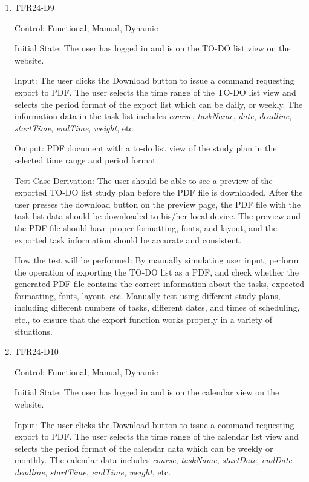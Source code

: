 \documentclass[12pt, titlepage]{article}
\begin{document}
\begin{enumerate}
\item{TFR24-D9\\}

Control: Functional, Manual, Dynamic
					
Initial State: The user has logged in and is on the TO-DO list view on the website.
					
Input: The user clicks the Download button to issue a command requesting export to PDF. The user selects the time range of the TO-DO list view and selects the period format of the export list which can be daily, or weekly. The information data in the task list includes \textit{course}, \textit{taskName}, \textit{date}, \textit{deadline}, \textit{startTime}, \textit{endTime}, \textit{weight}, etc.
					
Output: PDF document with a to-do list view of the study plan in the selected time range and period format.

Test Case Derivation: The user should be able to see a preview of the exported TO-DO list study plan before the PDF file is downloaded. After the user presses the download button on the preview page, the PDF file with the task list data should be downloaded to his/her local device. The preview and the PDF file should have proper formatting, fonts, and layout, and the exported task information should be accurate and consistent.
					
How the test will be performed: By manually simulating user input, perform the operation of exporting the TO-DO list as a PDF, and check whether the generated PDF file contains the correct information about the tasks, expected formatting, fonts, layout, etc. Manually test using different study plans, including different numbers of tasks, different dates, and times of scheduling, etc., to ensure that the export function works properly in a variety of situations.

\item{TFR24-D10\\}

Control: Functional, Manual, Dynamic
					
Initial State: The user has logged in and is on the calendar view on the website.
					
Input: The user clicks the Download button to issue a command requesting export to PDF. The user selects the time range of the calendar list view and selects the period format of the calendar data which can be weekly or monthly. The calendar data includes \textit{course}, \textit{taskName}, \textit{startDate}, \textit{endDate} \textit{deadline}, \textit{startTime}, \textit{endTime}, \textit{weight}, etc.
					

\end{enumerate}
\end{document}
